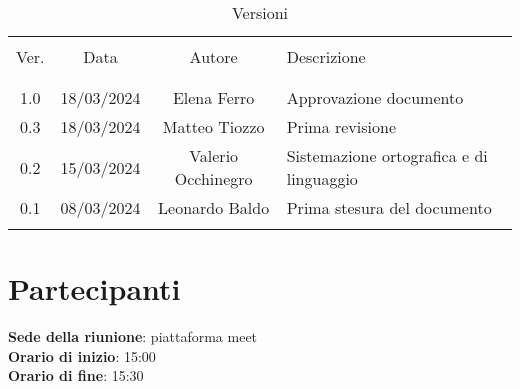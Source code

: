 \documentclass[italian,12pt]{article} %
\begin{document}


\newpage





\begin{table}[!h]
	\caption{Versioni}
	\begin{center}
		\begin{tabular}{ c c c p{9cm}}
			\hline \\[-2ex]
			Ver. & Data & Autore & Descrizione \\
			\\[-2ex] \hline \\[-1.5ex]
			1.0 & 18/03/2024 & Elena Ferro &  Approvazione documento\\
			0.3 & 18/03/2024 & Matteo Tiozzo & Prima revisione \\
			0.2 & 15/03/2024 & Valerio Occhinegro& Sistemazione ortografica e di linguaggio  \\
			0.1 & 08/03/2024 & Leonardo Baldo& Prima stesura del documento \\
			\\[-1.5ex] \hline
		\end{tabular}
	\end{center}
\end{table}
\newpage

\tableofcontents

\newpage
\section{Partecipanti}

\textbf{Sede della riunione}: piattaforma meet\\
\textbf{Orario di inizio}: 15:00\\
\textbf{Orario di fine}: 15:30\\
\end{document}
